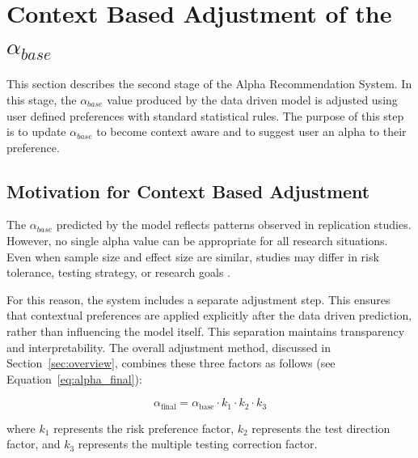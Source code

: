 {%



\section{Context Based Adjustment of the $\alpha_{base}$}
\label{sec:ContextFactors}
This section describes the second stage of the Alpha Recommendation System. In this stage, the $\alpha_{base}$ value produced by the data driven model is adjusted using user defined preferences with standard statistical rules. The purpose of this step is to update $\alpha_{base}$ to become context aware and to suggest user an alpha to their preference.

\subsection{Motivation for Context Based Adjustment}

The $\alpha_{base}$ predicted by the model reflects patterns observed in replication studies. However, no single alpha value can be appropriate for all research situations. Even when sample size and effect size are similar, studies may differ in risk tolerance, testing strategy, or research goals .

For this reason, the system includes a separate adjustment step. This ensures that contextual preferences are applied explicitly after the data driven prediction, rather than influencing the model itself. This separation maintains transparency and interpretability.
The overall adjustment method, discussed in Section~\ref{sec:overview}, 
combines these three factors as follows (see Equation~\ref{eq:alpha_final}):

\begin{equation}
	\alpha_{\text{final}} = \alpha_{\text{base}} \cdot k_1 \cdot k_2 \cdot k_3
	\label{eq:alpha_final}
\end{equation}

where $k_1$ represents the risk preference factor, 
$k_2$ represents the test direction factor, 
and $k_3$ represents the multiple testing correction factor.
}
